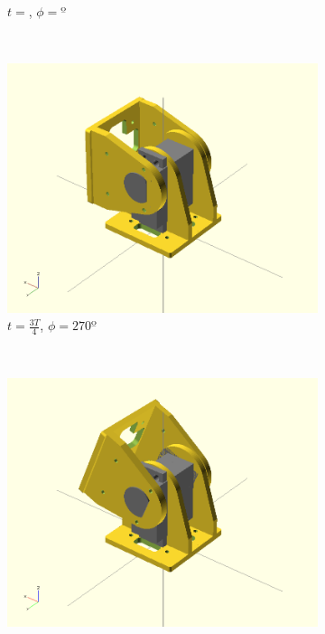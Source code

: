 \begin{figure}[h]
\begin{subfigure}[b]{0.18\textwidth}
                \caption{$t = $, $\phi=º$}
                \label{fig:Gait_osc_offset_22_5-2}
        \end{subfigure}
        ~
        \begin{subfigure}[b]{0.18\textwidth}
                \centering
                \includegraphics[width=\textwidth]{images/Gait_osc_offset_0.png}
                \caption{$t = \frac{3T}{4}$, $\phi=270º$}
                \label{fig:Gait_osc_offset_0-2}
        \end{subfigure}
        ~
        \begin{subfigure}[b]{0.18\textwidth}
         	   \centering
                \includegraphics[width=\textwidth]{images/Gait_osc_offset_22_5.png}

\end{subfigure}
\end{figure}
